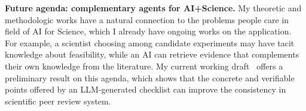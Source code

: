 \textbf{Future agenda: complementary agents for AI+Science.}
My theoretic and methodologic works have a natural connection to the problems people care in field of AI for Science, which I already have ongoing works on the application.
For example, a scientist choosing among candidate experiments may have tacit knowledge about feasibility, while an AI can retrieve evidence that complements their own knowledge from the literature.
My current working draft~\citep{liu2026checklists} offers a preliminary result on this agenda, which shows that the concrete and verifiable points offered by an LLM-generated checklist can improve the consistency in scientific peer review system.
